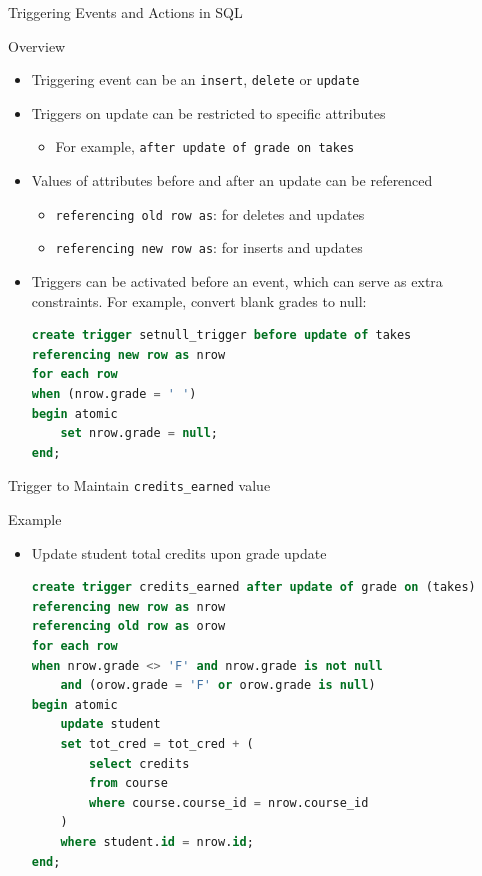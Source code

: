 \documentclass[aspectratio=169, xcolor=dvipsnames]{beamer}
\begin{document}
\begin{frame}[fragile]{Triggering Events and Actions in SQL}
    \begin{block}{Overview}
        \begin{itemize}[<+->]
            \item Triggering event can be an \texttt{insert}, \texttt{delete} or \texttt{update}
            \item Triggers on update can be restricted to specific attributes
            \begin{itemize}
                \item[$\triangleright$] For example, \texttt{after update of grade on takes}
            \end{itemize}
            \item Values of attributes before and after an update can be referenced
            \begin{itemize}
                \item[$\triangleright$] \texttt{referencing old row as}: for deletes and updates
                \item[$\triangleright$] \texttt{referencing new row as}: for inserts and updates
            \end{itemize}
            \item Triggers can be activated before an event, which can serve as extra constraints. For example, convert blank grades to null:
            \begin{lstlisting}[language=SQL, basicstyle=\ttfamily\scriptsize]
create trigger setnull_trigger before update of takes 
referencing new row as nrow 
for each row 
when (nrow.grade = ' ')
begin atomic 
    set nrow.grade = null;
end;
            \end{lstlisting}
        \end{itemize}
    \end{block}
\end{frame}

\begin{frame}[fragile]{Trigger to Maintain \texttt{credits\_earned} value}
    \begin{exampleblock}{Example}
        \begin{itemize}[<+->]
            \item Update student total credits upon grade update
            \begin{lstlisting}[language=SQL, basicstyle=\ttfamily\scriptsize]
create trigger credits_earned after update of grade on (takes) 
referencing new row as nrow 
referencing old row as orow 
for each row 
when nrow.grade <> 'F' and nrow.grade is not null 
    and (orow.grade = 'F' or orow.grade is null) 
begin atomic 
    update student 
    set tot_cred = tot_cred + (
        select credits 
        from course 
        where course.course_id = nrow.course_id 
    )
    where student.id = nrow.id;
end;
            \end{lstlisting}
        \end{itemize}
    \end{exampleblock}
\end{frame}
\end{document}
